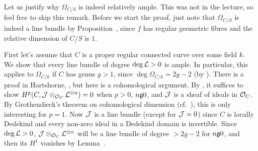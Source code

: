 \documentclass[a4paper,parskip=half,numbers=enddot, DIV=12]{scrreprt}
\begin{document}
\begin{rem}
	Let us justify why $\Omega_{C/S}$ is indeed relatively ample. This was not in the lecture, so feel free to skip this remark. Before we start the proof, just note that $\Omega_{C/S}$ is indeed a line bundle by Proposition~, since $f$ has regular geometric fibres and the relative dimension of $C/S$ is $1$.
	
	First let's assume that $C$ is a proper regular connected curve over some field $k$. We show that every line bundle of degree $\deg \mathcal{L}>0$ is ample. In particular, this applies to $\Omega_{C/k}$ if $C$ has genus $g>1$, since $\deg \Omega_{C/k}=2g-2$ (by \cite[Corollary~3.1.2]{alggeo2}). There is a proof in Hartshorne, \cite[Ch.\:III Corollary~3.3]{hartshorne}, but here is a cohomological argument. By \cite[Theorem~6]{alggeo2}, it suffices to show $H^p(C,\mathcal{J}\otimes_{\mathcal{O}_C}\mathcal{L}^{\otimes n})=0$ when $p>0$, $n\gge 0$, and $\mathcal{J}$ is a sheaf of ideals in $\mathcal{O}_C$. By Grothendieck's theorem on cohomological dimension (cf.\ \cite[Proposition~1.4.1]{alggeo2}), this is only interesting for $p=1$. Now $\mathcal{J}$ is a line bundle (except for $\mathcal{J}=0$) since $C$ is locally Dedekind and every non-zero ideal in a Dedekind domain is invertible. Since $\deg \mathcal{L}>0$, $\mathcal{J}\otimes_{\mathcal{O}_C}\mathcal{L}^{\otimes n}$ will be a line bundle of degree $>2g-2$ for $n\gge 0$, and then its $H^1$ vanishes by Lemma~.
	

\end{rem}
\end{document}
